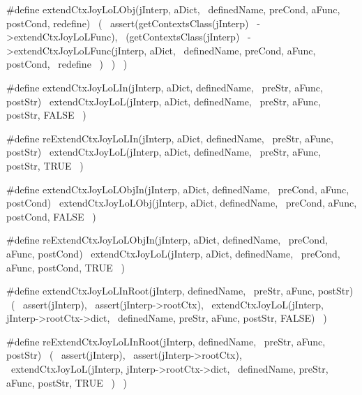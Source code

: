 #define extendCtxJoyLoLObj(jInterp, aDict,          \
  definedName, preCond, aFunc, postCond, redefine)  \
  (                                                 \
    assert(getContextsClass(jInterp)                \
      ->extendCtxJoyLoLFunc),                       \
    (getContextsClass(jInterp)                      \
      ->extendCtxJoyLoLFunc(jInterp, aDict,         \
        definedName, preCond, aFunc, postCond,      \
        redefine                                    \
      )                                             \
    )                                               \
  )
  
#define extendCtxJoyLoLIn(jInterp, aDict, definedName,  \
  preStr, aFunc, postStr)                               \
  extendCtxJoyLoL(jInterp, aDict, definedName,          \
    preStr, aFunc, postStr, FALSE                       \
  )
  
#define reExtendCtxJoyLoLIn(jInterp, aDict, definedName,  \
  preStr, aFunc, postStr)                                 \
  extendCtxJoyLoL(jInterp, aDict, definedName,            \
    preStr, aFunc, postStr, TRUE                          \
  )
  
#define extendCtxJoyLoLObjIn(jInterp, aDict, definedName, \
  preCond, aFunc, postCond)                               \
  extendCtxJoyLoLObj(jInterp, aDict, definedName,         \
    preCond, aFunc, postCond, FALSE                       \
  )
  
#define reExtendCtxJoyLoLObjIn(jInterp, aDict, definedName, \
  preCond, aFunc, postCond)                                 \
  extendCtxJoyLoL(jInterp, aDict, definedName,              \
    preCond, aFunc, postCond, TRUE                          \
  )
  
#define extendCtxJoyLoLInRoot(jInterp, definedName,   \
  preStr, aFunc, postStr)                             \
  (                                                   \
    assert(jInterp),                                  \
    assert(jInterp->rootCtx),                         \
    extendCtxJoyLoL(jInterp, jInterp->rootCtx->dict,  \
      definedName, preStr, aFunc, postStr, FALSE)     \
  )
  
#define reExtendCtxJoyLoLInRoot(jInterp, definedName, \
  preStr, aFunc, postStr)                             \
  (                                                   \
    assert(jInterp),                                  \
    assert(jInterp->rootCtx),                         \
    extendCtxJoyLoL(jInterp, jInterp->rootCtx->dict,  \
      definedName, preStr, aFunc, postStr, TRUE       \
    )                                                 \
  )

